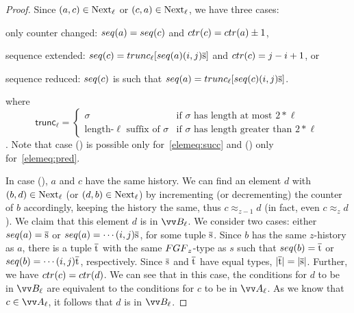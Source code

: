 \begin{proof}
  Since $(a,c) \in \mathrm{Next}_{\ell}$ or $(c,a) \in \mathrm{Next}_{\ell}$, we have three cases:
  \begin{romanenumerate}
    \item only counter changed: $\seq{a} = \seq{c}$ and $\ctr{c} = \ctr{a} \pm 1$,
    \item sequence extended: $\seq{c} = \mathsf{trunc}_{\ell}[\seq{a} (i,j) \elemtuples]$ and $\ctr{c} = j-i+1$, or
    \item sequence reduced: $\seq{c}$ is such that $\seq{a} = \mathsf{trunc}_{\ell}[\seq{c} (i,j) \elemtuples]$.
  \end{romanenumerate}
  where
  \begin{displaymath}
    \mathsf{trunc}_{\ell} =
    \begin{cases}
      \sigma & \text{if $\sigma$ has length at most $2 * \ell$} \\
      \text{length-$\ell$ suffix of $\sigma$} & \text{if $\sigma$ has length greater than $2 * \ell$}
    \end{cases}
  \end{displaymath}.
  Note that case () is possible only for~\ref{elemeq:succ} and () only for~\ref{elemeq:pred}.

  In case (), $a$ and $c$ have the same history.
  We can find an element $d$ with $(b,d) \in \mathrm{Next}_{\ell}$ (or $(d,b) \in \mathrm{Next}_{\ell}$) by incrementing (or decrementing) the counter of $b$ accordingly, keeping the history the same, thus $c \approx_{z-1} d$ (in fact, even $c \approx_{z} d$).
  We claim that this element $d$ is in $\unraveldom{B}_{\ell}$.
  We consider two cases: either $\seq{a} = \elemtuples$ or $\seq{a} = \cdots (i,j) \elemtuples$, for some tuple $\overline{\mathrm{s}}$.
  Since $b$ has the same $z$-history as $a$, there is a tuple $\overline{\mathrm{t}}$ with the same $\FGF_{z}$-type as $s$ such that $\seq{b} = \elemtuplet$ or $\seq{b} = \cdots (i,j) \elemtuplet$, respectively.
  Since $\overline{\mathrm{s}}$ and $\overline{\mathrm{t}}$ have equal types, $|\overline{\mathrm{t}}| = |\overline{\mathrm{s}}|$.
  Further, we have $\ctr{c} = \ctr{d}$.
  We can see that in this case, the conditions for $d$ to be in $\unraveldom{B}_{\ell}$ are equivalent to the conditions for $c$ to be in $\unraveldom{A}_{\ell}$.
  As we know that $c \in \unraveldom{A}_{\ell}$, it follows that $d$ is in $\unraveldom{B}_{\ell}$.


\end{proof}
